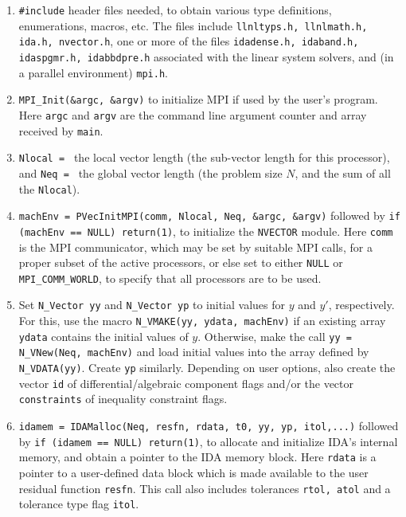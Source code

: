 \begin{enumerate}

\item {\tt \#include} header files needed, to obtain various type
definitions, enumerations, macros, etc.  The files include
{\tt llnltyps.h, llnlmath.h, ida.h, nvector.h}, one or more of the
files  {\tt idadense.h, idaband.h, idaspgmr.h, idabbdpre.h} associated
with the linear system solvers, and (in a parallel environment) 
{\tt mpi.h}.

\item {\tt MPI\_Init(\&argc, \&argv)} to initialize MPI if used by
the user's program.  Here {\tt argc} and {\tt argv} are the command
line argument counter and array received by {\tt main}.

\item {\tt Nlocal = } the local vector length (the sub-vector
length for this processor), and \newline
{\tt Neq = } the global vector length (the problem size $N$, and the
sum of all the {\tt Nlocal}).

\item {\tt machEnv = PVecInitMPI(comm, Nlocal, Neq, \&argc, \&argv)}
followed by \newline
{\tt if (machEnv == NULL) return(1)}, to initialize the 
{\tt NVECTOR} module.  Here {\tt comm} is the MPI communicator, which
may be set by suitable MPI calls, for a proper subset of the active
processors, or else set to either {\tt NULL} or 
{\tt MPI\_COMM\_WORLD}, to specify that all processors are to be used.

\item Set {\tt N\_Vector yy} and {\tt N\_Vector yp} to initial
values for $y$ and $y'$, respectively.  For this, use the macro
{\tt N\_VMAKE(yy, ydata, machEnv)} if an existing array {\tt ydata} 
contains the initial values of $y$.  Otherwise, make the call
{\tt yy = N\_VNew(Neq, machEnv)} and load initial values into
the array defined by {\tt N\_VDATA(yy)}.  Create {\tt yp} similarly.
Depending on user options, also create the vector {\tt id} of 
differential/algebraic component flags and/or the vector 
{\tt constraints} of inequality constraint flags.

\item {\tt idamem = IDAMalloc(Neq, resfn, rdata, t0, yy, yp, itol,...)} 
followed by \newline
{\tt if (idamem == NULL) return(1)}, to allocate and initialize
IDA's internal memory, and obtain a pointer to the IDA memory block.  
Here {\tt rdata} is a pointer to a user-defined data block which is
made available to the user residual function {\tt resfn}.
This call also includes tolerances {\tt rtol, atol} and a 
tolerance type flag {\tt itol}.


\end{enumerate}
